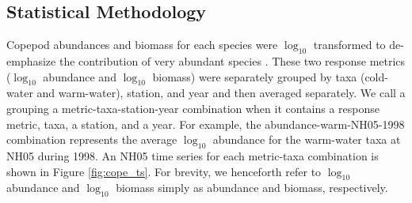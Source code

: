 \documentclass[preprint, authoryear, 12pt]{elsarticle}
\begin{document}
\subsection{Statistical Methodology}

Copepod abundances and biomass for each species were $\log_{10}$ transformed to de-emphasize the contribution of very abundant species \citep{mackas2001changes}. These two response metrics ($\log_{10}$ abundance and $\log_{10}$ biomass) were separately grouped by taxa (cold-water and warm-water), station, and year and then averaged separately. We call a grouping a metric-taxa-station-year combination when it contains a response metric, taxa, a station, and a year.  For example, the abundance-warm-NH05-1998 combination represents the average $\log_{10}$ abundance for the warm-water taxa at NH05 during 1998. An NH05 time series for each metric-taxa combination is shown in Figure \ref{fig:cope_ts}. For brevity, we henceforth refer to $\log_{10}$ abundance and $\log_{10}$ biomass simply as abundance and biomass, respectively. 
\captionsetup[subfigure]{labelformat=empty}
\end{document}
